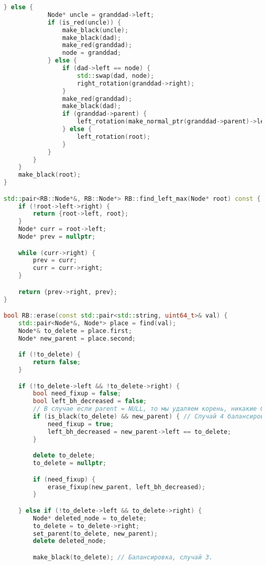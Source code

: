 \begin{lstlisting}[language=C++]
        } else {
            Node* uncle = granddad->left;
            if (is_red(uncle)) {
                make_black(uncle);
                make_black(dad);
                make_red(granddad);
                node = granddad;
            } else {
                if (dad->left == node) {
                    std::swap(dad, node);
                    right_rotation(granddad->right);
                }
                make_red(granddad);
                make_black(dad);
                if (granddad->parent) {
                    left_rotation(make_normal_ptr(granddad->parent)->left == granddad ? make_normal_ptr(granddad->parent)->left : make_normal_ptr(granddad->parent)->right);
                } else {
                    left_rotation(root);
                }
            }
        }
    }
    make_black(root);
}

std::pair<RB::Node*&, RB::Node*> RB::find_left_max(Node* root) const {
    if (!root->left->right) {
        return {root->left, root};
    }
    Node* curr = root->left;
    Node* prev = nullptr;

    while (curr->right) {
        prev = curr;
        curr = curr->right;
    }

    return {prev->right, prev};
}

bool RB::erase(const std::pair<std::string, uint64_t>& val) {
    std::pair<Node*&, Node*> place = find(val);
    Node*& to_delete = place.first;
    Node* new_parent = place.second;

    if (!to_delete) {
        return false;
    }

    if (!to_delete->left && !to_delete->right) {
        bool need_fixup = false;
        bool left_bh_decreased = false;
        // В случае если parent = NULL, то мы удаляем корень, никакие балансировки не нужны.
        if (is_black(to_delete) && new_parent) { // Случай 4 балансировки. Определяем с какой стороны у нашего отца необходима балансировка.
            need_fixup = true;
            left_bh_decreased = new_parent->left == to_delete;
        }

        delete to_delete;
        to_delete = nullptr;

        if (need_fixup) {
            erase_fixup(new_parent, left_bh_decreased);
        }

    } else if (!to_delete->left && to_delete->right) {
        Node* deleted_node = to_delete;
        to_delete = to_delete->right;
        set_parent(to_delete, new_parent);
        delete deleted_node;

        make_black(to_delete); // Балансировка, случай 3.


\end{lstlisting}
